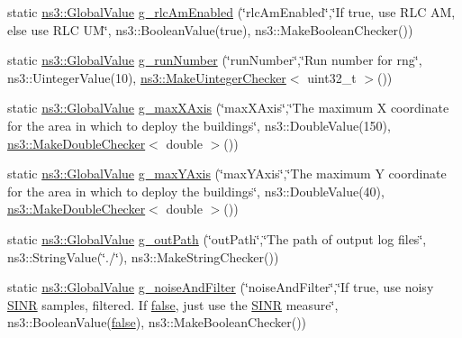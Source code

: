 \begin{DoxyCompactItemize}
\item 
static \hyperlink{classns3_1_1GlobalValue}{ns3\+::\+Global\+Value} \hyperlink{mc-twoenbs_8cc_ad58c0bca4940ad128156370612451147}{g\+\_\+rlc\+Am\+Enabled} (\char`\"{}rlc\+Am\+Enabled\char`\"{},\char`\"{}If true, use R\+LC AM, else use R\+LC UM\char`\"{}, ns3\+::\+Boolean\+Value(true), ns3\+::\+Make\+Boolean\+Checker())
\item 
static \hyperlink{classns3_1_1GlobalValue}{ns3\+::\+Global\+Value} \hyperlink{mc-twoenbs_8cc_a64b48b780fb569c9c226fe3a9d8fefda}{g\+\_\+run\+Number} (\char`\"{}run\+Number\char`\"{},\char`\"{}Run number for rng\char`\"{}, ns3\+::\+Uinteger\+Value(10), \hyperlink{namespacens3_aed274764da411ed9397a3524a7c9abb8}{ns3\+::\+Make\+Uinteger\+Checker}$<$ uint32\+\_\+t $>$())
\item 
static \hyperlink{classns3_1_1GlobalValue}{ns3\+::\+Global\+Value} \hyperlink{mc-twoenbs_8cc_af3c84bb7021b65123942d41b00cc0e61}{g\+\_\+max\+X\+Axis} (\char`\"{}max\+X\+Axis\char`\"{},\char`\"{}The maximum X coordinate for the area in which to deploy the buildings\char`\"{}, ns3\+::\+Double\+Value(150), \hyperlink{namespacens3_a0f8000e7b66dd988358648f0b16c7709}{ns3\+::\+Make\+Double\+Checker}$<$ double $>$())
\item 
static \hyperlink{classns3_1_1GlobalValue}{ns3\+::\+Global\+Value} \hyperlink{mc-twoenbs_8cc_ad14672f1ad4129263994be791ba0468b}{g\+\_\+max\+Y\+Axis} (\char`\"{}max\+Y\+Axis\char`\"{},\char`\"{}The maximum Y coordinate for the area in which to deploy the buildings\char`\"{}, ns3\+::\+Double\+Value(40), \hyperlink{namespacens3_a0f8000e7b66dd988358648f0b16c7709}{ns3\+::\+Make\+Double\+Checker}$<$ double $>$())
\item 
static \hyperlink{classns3_1_1GlobalValue}{ns3\+::\+Global\+Value} \hyperlink{mc-twoenbs_8cc_a3b7adf32c5e93e9c5886e2c86c732557}{g\+\_\+out\+Path} (\char`\"{}out\+Path\char`\"{},\char`\"{}The path of output log files\char`\"{}, ns3\+::\+String\+Value(\char`\"{}./\char`\"{}), ns3\+::\+Make\+String\+Checker())
\item 
static \hyperlink{classns3_1_1GlobalValue}{ns3\+::\+Global\+Value} \hyperlink{mc-twoenbs_8cc_a1e5a3eeb671d2cf5388b7f414c4c22e3}{g\+\_\+noise\+And\+Filter} (\char`\"{}noise\+And\+Filter\char`\"{},\char`\"{}If true, use noisy \hyperlink{lte__ue__measurements_8m_abc8bd373f848d7a3307fffe0fd5b5707}{S\+I\+NR} samples, filtered. If \hyperlink{lte__cqi__generation_8m_ab1bef239d413c4da139c4bac92cd657a}{false}, just use the \hyperlink{lte__ue__measurements_8m_abc8bd373f848d7a3307fffe0fd5b5707}{S\+I\+NR} measure\char`\"{}, ns3\+::\+Boolean\+Value(\hyperlink{lte__cqi__generation_8m_ab1bef239d413c4da139c4bac92cd657a}{false}), ns3\+::\+Make\+Boolean\+Checker())

\end{DoxyCompactItemize}
